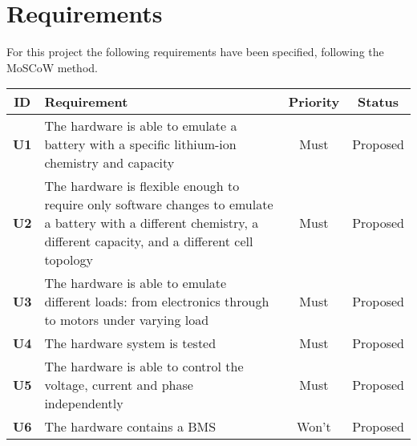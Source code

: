 \section{Requirements}
For this project the following requirements have been specified, following the MoSCoW method. 

\begin{longtable}{|c|p{10cm}|c|c|}
    \hline
    \textbf{ID} & \textbf{Requirement} & \textbf{Priority} & \textbf{Status}\\ \hline 
    \textbf{U1} & The hardware is able to emulate a battery with a specific lithium-ion chemistry and capacity & Must & Proposed\\ \hline
    \textbf{U2} & The hardware is flexible enough to require only software changes to emulate a battery with a different chemistry, a different capacity, and a different cell topology & Must & Proposed\\ \hline
    \textbf{U3} & The hardware is able to emulate different loads: from electronics through to motors under varying load & Must & Proposed\\ \hline
    \textbf{U4} & The hardware system is tested & Must & Proposed\\ \hline
    \textbf{U5} & The hardware is able to control the voltage, current and phase independently & Must & Proposed\\ \hline
    \textbf{U6} & The hardware contains a BMS & Won't & Proposed\\ \hline
\end{longtable}